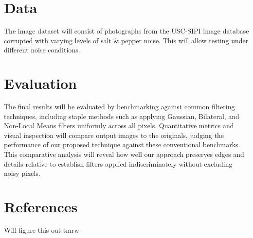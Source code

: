 \documentclass[10pt,twocolumn,letterpaper]{article}
\begin{document}
\section{Data}
The image dataset will consist of photographs from the USC-SIPI image
database corrupted with varying levels of salt & pepper noise.
This will allow testing under different noise conditions.

\section{Evaluation}
The final results will be evaluated by benchmarking against common
filtering techniques, including staple methods such as applying Gaussian,
Bilateral, and Non-Local Means filters uniformly across all pixels.
Quantitative metrics and visual inspection will compare output images to
the originals, judging the performance of our proposed technique against
these conventional benchmarks. This comparative analysis will reveal how
well our approach preserves edges and details relative to establish filters
applied indiscriminately without excluding noisy pixels.

\section{References}
Will figure this out tmrw
\end{document}
